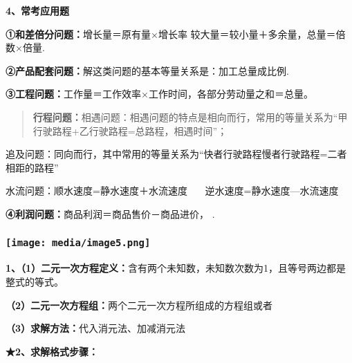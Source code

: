 \documentclass[a4paper,11pt,UTF8]{ctexart}
\begin{document}
\textbf{4、常考应用题}

\textbf{①和差倍分问题：}增长量＝原有量×增长率
较大量＝较小量＋多余量，总量＝倍数×倍量.

\textbf{②产品配套问题：}解这类问题的基本等量关系是：加工总量成比例.

\textbf{③工程问题：}工作量＝工作效率×工作时间，各部分劳动量之和＝总量。

\begin{quote}
\textbf{行程问题：}相遇问题：相遇问题的特点是相向而行，常用的等量关系为``甲行驶路程+乙行驶路程=总路程，相遇时间''；
\end{quote}

追及问题：同向而行，其中常用的等量关系为``快者行驶路程慢者行驶路程=二者相距的路程''

水流问题：顺水速度=静水速度＋水流速度~~~ 逆水速度=静水速度---水流速度

\textbf{④利润问题：}商品利润＝商品售价－商品进价， .

\hypertarget{ux5b66ux79d1ux7f51www.zxxk.com--ux6559ux80b2ux8d44ux6e90ux95e8ux6237ux63d0ux4f9bux8bd5ux9898ux8bd5ux5377ux6559ux6848ux8bfeux4ef6ux6559ux5b66ux8bbaux6587ux7d20ux6750ux7b49ux5404ux7c7bux6559ux5b66ux8d44ux6e90ux5e93ux4e0bux8f7dux8fd8ux6709ux5927ux91cfux4e30ux5bccux7684ux6559ux5b66ux8d44ux8baf-32}{%
\subsubsection{\texorpdfstring{\protect\texttt{[image: media/image5.png]}}{学科网(www.zxxk.com)-\/-教育资源门户，提供试题试卷、教案、课件、教学论文、素材等各类教学资源库下载，还有大量丰富的教学资讯！}}\label{ux5b66ux79d1ux7f51www.zxxk.com--ux6559ux80b2ux8d44ux6e90ux95e8ux6237ux63d0ux4f9bux8bd5ux9898ux8bd5ux5377ux6559ux6848ux8bfeux4ef6ux6559ux5b66ux8bbaux6587ux7d20ux6750ux7b49ux5404ux7c7bux6559ux5b66ux8d44ux6e90ux5e93ux4e0bux8f7dux8fd8ux6709ux5927ux91cfux4e30ux5bccux7684ux6559ux5b66ux8d44ux8baf-32}}

\textbf{1、（1）二元一次方程定义：}含有两个未知数，未知数次数为1，且等号两边都是整式的等式。

\textbf{（2）二元一次方程组：}两个二元一次方程所组成的方程组或者

\textbf{（3）求解方法：}代入消元法、加减消元法

\textbf{★2、求解格式步骤：}
\end{document}
